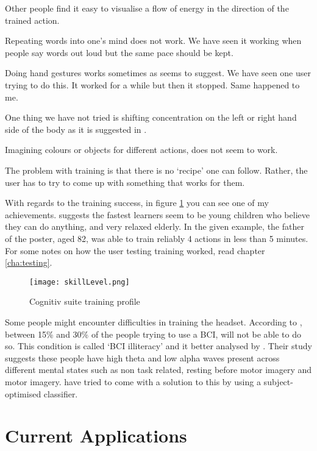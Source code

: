 Other people find it easy to visualise a flow of energy in the direction of the trained action. 

Repeating words into one's mind does not work. We have seen it working when people say words out loud but the same pace should be kept.

Doing hand gestures works sometimes as \cite{emoTraining} seems to suggest. We have seen one user trying to do this. It worked for a while but then it stopped. Same happened to me.

One thing we have not tried is shifting concentration on the left or right hand side of the body as it is suggested in \cite{emoTraining}.

Imagining colours or objects for different actions, does not seem to work.

The problem with training is that there is no `recipe' one can follow. Rather, the user has to try to come up with something that works for them. 

With regards to the training success, in figure \ref{fig:skillLevelMe} you can see one of my achievements. \cite{emoTraining} suggests the fastest learners seem to be young children who believe they can do anything, and very relaxed elderly. In the given example, the father of the poster, aged 82, was able to train reliably 4 actions in less than 5 minutes. For some notes on how the user testing training worked, read chapter \ref{cha:testing}.

\begin{figure}
  \centering
  \texttt{[image: skillLevel.png]}
  \caption{Cognitiv suite training profile}
    \label{fig:skillLevelMe}          
\end{figure}

Some people might encounter difficulties in training the headset. According to \cite{cureBCIilliteracy}, between 15\% and 30\% of the people trying to use a BCI, will not be able to do so. This condition is called `BCI illiteracy' and it better analysed by \cite{BCIilliteracy}. Their study suggests these people have high theta and low alpha waves present across different mental states such as non task related, resting before motor imagery and motor imagery. \cite{cureBCIilliteracy} have tried to come with a solution to this by using a subject-optimised classifier.

\section{Current Applications}
\label{sec:currentApplication}

